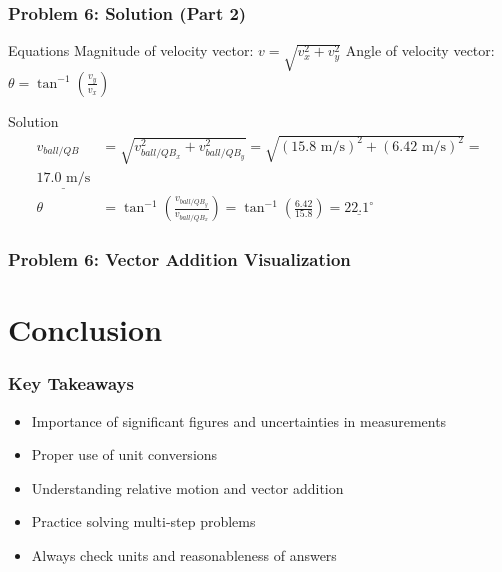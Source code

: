 \documentclass{beamer}
\begin{document}
\begin{frame}
\frametitle{Problem 6: Solution (Part 2)}
\begin{block}{Equations}
Magnitude of velocity vector: $v = \sqrt{v_x^2 + v_y^2}$
Angle of velocity vector: $\theta = \tan^{-1}\left(\frac{v_y}{v_x}\right)$
\end{block}
\begin{block}{Solution}
\begin{align*}
v_{ball/QB} &= \sqrt{v_{ball/QB_x}^2 + v_{ball/QB_y}^2} = \sqrt{(15.8 \text{ m/s})^2 + (6.42 \text{ m/s})^2} = \\\underline{17.0 \text{ m/s}}\\
\theta &= \tan^{-1}\left(\frac{v_{ball/QB_y}}{v_{ball/QB_x}}\right) = \tan^{-1}\left(\frac{6.42}{15.8}\right) = \underline{22.1^{\circ}}
\end{align*}
\end{block}
\end{frame}

\begin{frame}
\frametitle{Problem 6: Vector Addition Visualization}
\end{frame}

\section{Conclusion}

\begin{frame}
\frametitle{Key Takeaways}
\begin{itemize}
    \item Importance of significant figures and uncertainties in measurements
    \item Proper use of unit conversions
    \item Understanding relative motion and vector addition
    \item Practice solving multi-step problems
    \item Always check units and reasonableness of answers
\end{itemize}
\end{frame}
\end{document}
